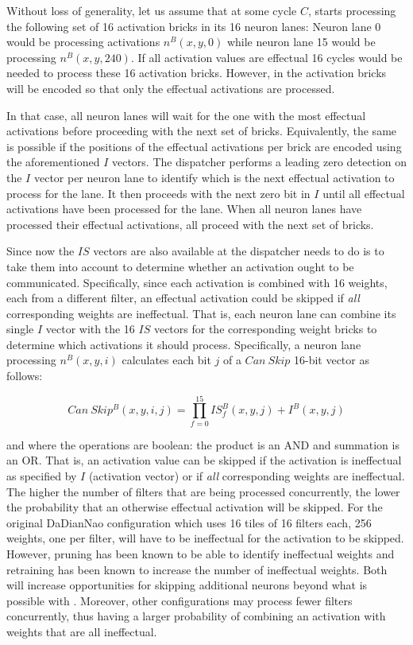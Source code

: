 %
Without loss of generality, let us assume that at some cycle $C$, \ZFL starts processing the following set of 16 activation bricks in its 16 neuron lanes: Neuron lane 0 would be processing activations $n^B(x,y,0)$ while neuron lane 15 would be processing $n^B(x,y,240)$. If all activation values are effectual 16 cycles would be needed to process these 16 activation bricks. However, in \ZFL the activation bricks will be encoded so that only the effectual activations are processed. 

%
In that case, all neuron lanes will wait for the one with the most effectual activations before proceeding with the next set of bricks. Equivalently, the same is possible if the positions of the effectual activations per brick are encoded using the aforementioned $I$ vectors. The dispatcher performs a leading zero detection on the $I$ vector per neuron lane to identify which is the next effectual activation to process for the lane. It then proceeds with the next zero bit in $I$ until all effectual activations have been processed for the lane. When all neuron lanes have processed their effectual activations, all proceed with the next set of bricks.

Since now the $IS$ vectors are also available at the dispatcher needs to do is to take them into account to determine whether an activation ought to be communicated. Specifically, since each activation is combined with 16 weights, each from a different filter, an effectual activation could be skipped if \textit{all} corresponding weights are ineffectual. That is, each neuron lane can combine its single $I$ vector with the 16 $IS$ vectors for the corresponding weight bricks to determine which activations it should process. Specifically, a neuron lane processing $n^B(x,y,i)$ calculates each bit $j$ of a $Can\ Skip$ 16-bit vector as follows:

\begin{equation}
\label{eq:CanSkip}
Can\ Skip^B(x,y,i,j) = \prod_{f=0}^{15}IS^B_f(x,y,j) + I^B(x,y,j)
\end{equation}

and where the operations are boolean: the product is an AND and summation is an OR.
That is, an activation value can be skipped if the activation is ineffectual as specified by  $I$ (activation vector) or if \textit{all} corresponding weights are ineffectual. The higher the number of filters that are being processed concurrently, the lower the probability that an otherwise effectual activation will be skipped. For the original DaDianNao configuration which uses 16 tiles of 16 filters each, 256 weights, one per filter, will have to be ineffectual for the activation to be skipped. However, pruning has been known to be able to identify ineffectual weights and retraining has been known to increase the number of ineffectual weights. Both will increase opportunities for skipping additional neurons beyond what is possible with \ZFL.
Moreover, other configurations may process fewer filters concurrently, thus having a larger probability of combining an activation with weights that are all ineffectual.

